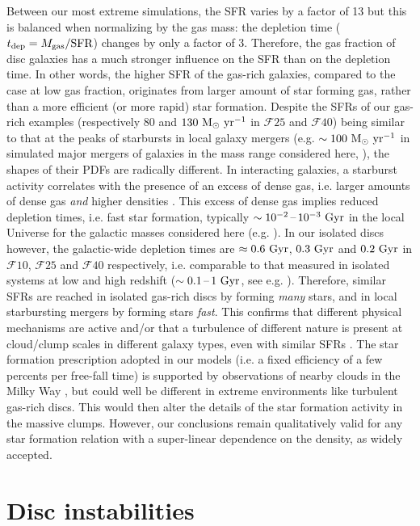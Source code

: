 \documentclass[useAMS,usenatbib]{mnras}
\newcommand{\gs}{\ensuremath{\mathcal{F}10}\xspace}
\newcommand{\gm}{\ensuremath{\mathcal{F}25}\xspace}
\newcommand{\gl}{\ensuremath{\mathcal{F}40}\xspace}
\begin{document}
Between our most extreme simulations, the SFR varies by a factor of 13 but this is balanced when normalizing by the gas mass: the depletion time ($t_\mathrm{dep} = M_{\rm gas} / {\rm SFR}$) changes by only a factor of 3. Therefore, the gas fraction of disc galaxies has a much stronger influence on the SFR than on the depletion time. In other words, the higher SFR of the gas-rich galaxies, compared to the case at low gas fraction, originates from larger amount of star forming gas, rather than a more efficient (or more rapid) star formation. Despite the SFRs of our gas-rich examples (respectively 80 and $130 \mathrm{~M}_{\odot}\mathrm{~yr}^{-1}$ in \gm and \gl) being similar to that at the peaks of starbursts in local galaxy mergers (e.g. $\sim 100 \mathrm{~M}_{\odot}\mathrm{~yr}^{-1}$ in simulated major mergers of galaxies in the mass range considered here, \citealt{Renaud2014b}), the shapes of their PDFs are radically different. In interacting galaxies, a starburst activity correlates with the presence of an excess of dense gas, i.e. larger amounts of dense gas \emph{and} higher densities \citep{Renaud2019b}. This excess of dense gas implies reduced depletion times, i.e. fast star formation, typically $\sim 10^{-2} \textrm{\,--\,} 10^{-3} \mathrm{~Gyr}$ in the local Universe for the galactic masses considered here (e.g. \citealt{Martinez2012, Diaz2020}). In our isolated discs however, the galactic-wide depletion times are $\approx 0.6 \mathrm{~Gyr}$, $0.3 \mathrm{~Gyr}$ and $0.2 \mathrm{~Gyr}$ in \gs, \gm and \gl respectively, i.e. comparable to that measured in isolated systems at low and high redshift ($\sim 0.1\textrm{\,--\,} 1 \mathrm{~Gyr}$, see e.g. \citealt{Bigiel2010, Saintonge2011, Leroy2013, Tacconi2013}). Therefore, similar SFRs are reached in isolated gas-rich discs by forming \emph{many} stars, and in local starbursting mergers by forming stars \emph{fast}. This confirms that different physical mechanisms are active and/or that a turbulence of different nature is present at cloud/clump scales in different galaxy types, even with similar SFRs \citep{Renaud2014b}. The star formation prescription adopted in our models (i.e. a fixed efficiency of a few percents per free-fall time) is supported by observations of nearby clouds in the Milky Way \citep[e.g.][]{Elmegreen2002, Krumholz2007}, but could well be different in extreme environments like turbulent gas-rich discs. This would then alter the details of the star formation activity in the massive clumps. However, our conclusions remain qualitatively valid for any star formation relation with a super-linear dependence on the density, as widely accepted.


\section{Disc instabilities}
\label{sec:stability}
\end{document}
